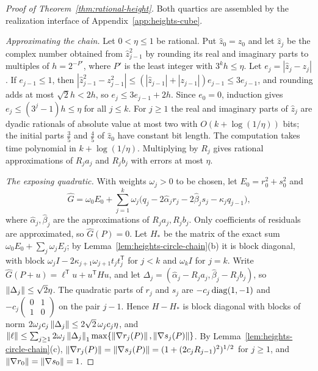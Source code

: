 \begin{proof}[Proof of Theorem~\ref{thm:rational-height}]
Both quartics are assembled by the realization interface of
Appendix~\ref{app:heights-cube}.

\emph{Approximating the chain.} Let $0<\eta\le1$ be rational. Put
$\hat z_0=z_0$ and let $\hat z_j$ be the complex number obtained from
$\hat z_{j-1}^2$ by rounding its real and imaginary parts to multiples of
$h=2^{-P'}$, where $P'$ is the least integer with $3^kh\le\eta$. Let
$e_j=|\hat z_j-z_j|$. If $e_{j-1}\le1$, then
$|\hat z_{j-1}^2-z_{j-1}^2|\le(|\hat z_{j-1}|+|z_{j-1}|)e_{j-1}\le3e_{j-1}$,
and rounding adds at most $\sqrt2h<2h$, so $e_j\le3e_{j-1}+2h$. Since
$e_0=0$, induction gives $e_j\le(3^j-1)h\le\eta$ for all $j\le k$. For
$j\ge1$ the real and imaginary parts of $\hat z_j$ are dyadic rationals of
absolute value at most two with $O(k+\log(1/\eta))$ bits; the initial parts
$\frac35$ and $\frac45$ of $\hat z_0$ have constant bit length. The
computation takes time polynomial in $k+\log(1/\eta)$. Multiplying by $R_j$
gives rational approximations of $R_ja_j$ and $R_jb_j$ with errors at most
$\eta$.

\emph{The exposing quadratic.} With weights $\omega_j>0$ to be chosen, let
$E_0=r_0^2+s_0^2$ and
\[
 \hat G=\omega_0E_0+\sum_{j=1}^k\omega_j\bigl(q_j-2\hat\alpha_jr_j
   -2\hat\beta_js_j-\kappa_jq_{j-1}\bigr),
\]
where $\hat\alpha_j,\hat\beta_j$ are the approximations of $R_ja_j,R_jb_j$.
Only coefficients of residuals are approximated, so $\hat G(P)=0$. Let $H_*$
be the matrix of the exact sum $\omega_0E_0+\sum_j\omega_jE_j$; by
Lemma~\ref{lem:heights-circle-chain}(b) it is block diagonal, with block
$\omega_jI-2\kappa_{j+1}\omega_{j+1}t_jt_j^{\mathsf T}$ for $j<k$ and
$\omega_kI$ for $j=k$. Write $\hat G(P+u)=\ell^{\mathsf T}u+u^{\mathsf T}Hu$,
and let $\Delta_j=(\hat\alpha_j-R_ja_j,\hat\beta_j-R_jb_j)$, so
$\left\lVert\Delta_j\right\rVert\le\sqrt2\eta$. The quadratic parts of $r_j$ and $s_j$ are
$-c_j\operatorname{diag}(1,-1)$ and $-c_j\left(\begin{smallmatrix}0&1\\1&0\end{smallmatrix}
\right)$ on the pair $j-1$. Hence $H-H_*$ is block diagonal with blocks of
norm $2\omega_jc_j\left\lVert\Delta_j\right\rVert\le2\sqrt2\,\omega_jc_j\eta$, and
$\left\lVert\ell\right\rVert\le\sum_{j\ge1}2\omega_j\left\lVert\Delta_j\right\rVert_1
\max\{\left\lVert\nabla r_j(P)\right\rVert,\left\lVert\nabla s_j(P)\right\rVert\}$. By
Lemma~\ref{lem:heights-circle-chain}(c),
$\left\lVert\nabla r_j(P)\right\rVert=\left\lVert\nabla s_j(P)\right\rVert=(1+(2c_jR_{j-1})^2)^{1/2}$ for
$j\ge1$, and $\left\lVert\nabla r_0\right\rVert=\left\lVert\nabla s_0\right\rVert=1$.


\end{proof}
